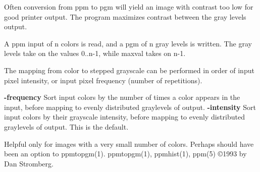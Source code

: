 Often conversion from ppm to pgm will yield an image with contrast too
low for good printer output.  The program maximizes contrast between
the gray levels output.

A ppm input of n colors is read, and a pgm of n gray levels is written.
The gray levels take on the values 0..n-1, while maxval takes on n-1.

The mapping from color to stepped grayscale can be performed in order
of input pixel intensity, or input pixel frequency (number of repetitions).
\begin{TPlist}{}
\item[{}]
{\bf -frequency}
Sort input colors by the number of times a color appears in the input,
before mapping to evenly distributed graylevels of output.
{\bf -intensity}
Sort input colors by their grayscale intensity, before mapping to evenly
distributed graylevels of output.  This is the default.
\end{TPlist}

Helpful only for images with a very small number of colors.
Perhaps should have been an option to ppmtopgm(1).
ppmtopgm(1), ppmhist(1), ppm(5)
\copyright 1993 by Dan Stromberg.
%
 
%

\newpage
%


